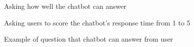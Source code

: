 \documentclass[12pt,oneside,openright,a4paper]{cpe-english-project}
\begin{document}
\begin{figure}[!h]\centering
	\caption{Asking how well the chatbot can answer}
\end{figure}

\begin{figure}[!h]\centering
	\caption{Asking users to score the chatbot's response time from 1 to 5}
\end{figure}

\begin{figure}[!h]\centering
	\caption{Example of question that chatbot can answer from user}
\end{figure}
\end{document}
